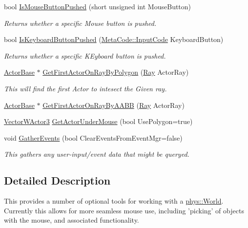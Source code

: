 \begin{DoxyCompactItemize}
bool \hyperlink{classphys_1_1WorldQueryTool_af277b578432dfaefffbc4fd9bb80ca64}{IsMouseButtonPushed} (short unsigned int MouseButton)
\begin{DoxyCompactList}\small\item\em Returns whether a specific Mouse button is pushed. \item\end{DoxyCompactList}\item 
bool \hyperlink{classphys_1_1WorldQueryTool_a8343f54b900adb316ddc6de5405da328}{IsKeyboardButtonPushed} (\hyperlink{classphys_1_1MetaCode_a3e501cbb5bf0f6f1fdb7211465bda8d8}{MetaCode::InputCode} KeyboardButton)
\begin{DoxyCompactList}\small\item\em Returns whether a specific KEyboard button is pushed. \item\end{DoxyCompactList}\item 
\hyperlink{classphys_1_1ActorBase}{ActorBase} $\ast$ \hyperlink{classphys_1_1WorldQueryTool_af5864818aad3e6d44452ae6f6d0ba4b6}{GetFirstActorOnRayByPolygon} (\hyperlink{classphys_1_1Ray}{Ray} ActorRay)
\begin{DoxyCompactList}\small\item\em This will find the first Actor to intesect the Given ray. \item\end{DoxyCompactList}\item 
\hyperlink{classphys_1_1ActorBase}{ActorBase} $\ast$ \hyperlink{classphys_1_1WorldQueryTool_ac727c485571593a81d5828bfaf17e545}{GetFirstActorOnRayByAABB} (\hyperlink{classphys_1_1Ray}{Ray} ActorRay)
\item 
\hyperlink{classphys_1_1VectorWActor3}{VectorWActor3} \hyperlink{classphys_1_1WorldQueryTool_a2b1e95fb1ed9ceb7e26210c884c4a1db}{GetActorUnderMouse} (bool UsePolygon=true)
\item 
void \hyperlink{classphys_1_1WorldQueryTool_ae387ff047f3cdf408d8959b8cbf4cc57}{GatherEvents} (bool ClearEventsFromEventMgr=false)
\begin{DoxyCompactList}\small\item\em This gathers any user-\/input/event data that might be queryed. \item\end{DoxyCompactList}\end{DoxyCompactItemize}


\subsection{Detailed Description}
This provides a number of optional tools for working with a \hyperlink{classphys_1_1World}{phys::World}. Currently this allows for more seamless mouse use, including 'picking' of objects with the mouse, and associated functionality. 

